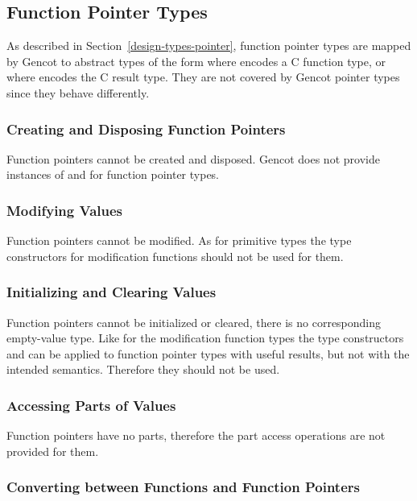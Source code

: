 \subsection{Function Pointer Types}
\label{design-operations-function}

As described in Section~\ref{design-types-pointer}, function pointer types are mapped by Gencot to abstract types of the form 
 where  encodes a C function type, or  where 
encodes the C result type. They are not covered by Gencot pointer types since they behave differently.

\subsubsection{Creating and Disposing Function Pointers}

Function pointers cannot be created and disposed. Gencot does not provide instances of  and 
for function pointer types.

\subsubsection{Modifying Values}

Function pointers cannot be modified. As for primitive types the type constructors for modification functions should not be used for them.

\subsubsection{Initializing and Clearing Values}

Function pointers cannot be initialized or cleared, there is no corresponding empty-value type.
Like for the modification function types the type constructors
 and  can be applied to function pointer types with useful results, but not with the intended semantics.
Therefore they should not be used.

\subsubsection{Accessing Parts of Values}

Function pointers have no parts, therefore the part access operations are not provided for them.

\subsubsection{Converting between Functions and Function Pointers}

